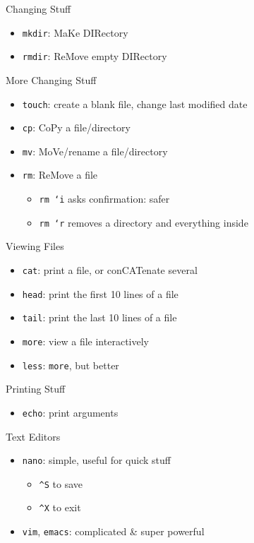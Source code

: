 \documentclass[pdf,usenames,dvipsnames,14pt]{beamer}%
\newcommand\hyphen{\char`\-}
\newcommand\textasciicaret{\textasciicircum}
\begin{document}
\begin{frame}{Changing Stuff}
	\begin{itemize}
		\item \texttt{mkdir}: MaKe DIRectory
		\item \texttt{rmdir}: ReMove empty DIRectory
	\end{itemize}
\end{frame}

\begin{frame}{More Changing Stuff}
	\begin{itemize}
		\item \texttt{touch}: create a blank file, change last modified date
		\item \texttt{cp}: CoPy a file/directory
		\item \texttt{mv}: MoVe/rename a file/directory
		\item \texttt{rm}: ReMove a file
		\begin{itemize}
			\item \texttt{rm \hyphen i} asks confirmation: safer
			\item \texttt{rm \hyphen r} removes a directory and everything inside
		\end{itemize}
	\end{itemize}
\end{frame}

\begin{frame}{Viewing Files}
	\begin{itemize}
		\item \texttt{cat}: print a file, or conCATenate several
		\item \texttt{head}: print the first 10 lines of a file
		\item \texttt{tail}: print the last 10 lines of a file
		\item \texttt{more}: view a file interactively
		\item \texttt{less}: \texttt{more}, but better
	\end{itemize}
\end{frame}

\begin{frame}{Printing Stuff}
	\begin{itemize}
		\item \texttt{echo}: print arguments
	\end{itemize}
\end{frame}

\begin{frame}{Text Editors}
	\begin{itemize}
		\item \texttt{nano}: simple, useful for quick stuff
		\begin{itemize}
			\item \texttt{\textasciicaret S} to save
			\item \texttt{\textasciicaret X} to exit
		\end{itemize}
		\item \texttt{vim}, \texttt{emacs}: complicated \& super powerful
	\end{itemize}
\end{frame}
\end{document}
